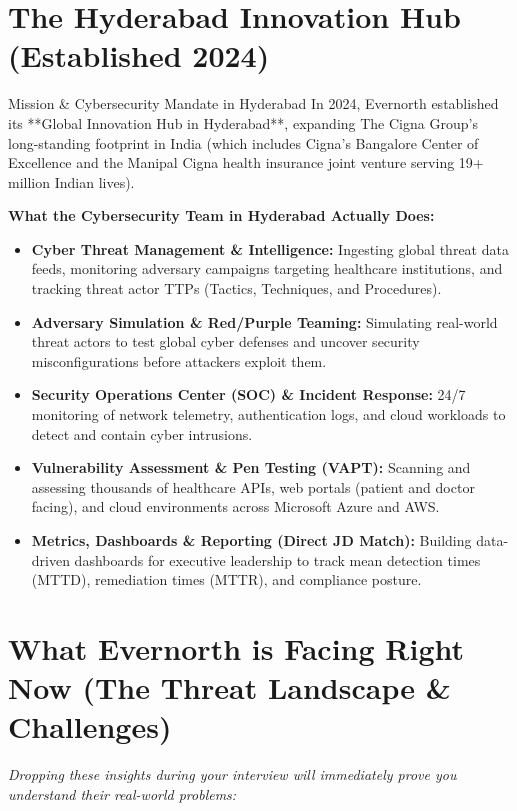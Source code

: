 \documentclass[11pt,a4paper]{article}
\begin{document}
\section{The Hyderabad Innovation Hub (Established 2024)}

\begin{evernorthbox}{Mission \& Cybersecurity Mandate in Hyderabad}
In 2024, Evernorth established its **Global Innovation Hub in Hyderabad**, expanding The Cigna Group's long-standing footprint in India (which includes Cigna's Bangalore Center of Excellence and the Manipal Cigna health insurance joint venture serving 19+ million Indian lives).

\textbf{What the Cybersecurity Team in Hyderabad Actually Does:}
\begin{itemize}
    \item \textbf{Cyber Threat Management \& Intelligence:} Ingesting global threat data feeds, monitoring adversary campaigns targeting healthcare institutions, and tracking threat actor TTPs (Tactics, Techniques, and Procedures).
    \item \textbf{Adversary Simulation \& Red/Purple Teaming:} Simulating real-world threat actors to test global cyber defenses and uncover security misconfigurations before attackers exploit them.
    \item \textbf{Security Operations Center (SOC) \& Incident Response:} 24/7 monitoring of network telemetry, authentication logs, and cloud workloads to detect and contain cyber intrusions.
    \item \textbf{Vulnerability Assessment \& Pen Testing (VAPT):} Scanning and assessing thousands of healthcare APIs, web portals (patient and doctor facing), and cloud environments across Microsoft Azure and AWS.
    \item \textbf{Metrics, Dashboards \& Reporting (Direct JD Match):} Building data-driven dashboards for executive leadership to track mean detection times (MTTD), remediation times (MTTR), and compliance posture.
\end{itemize}
\end{evernorthbox}

\section{What Evernorth is Facing Right Now (The Threat Landscape \& Challenges)}
\textit{Dropping these insights during your interview will immediately prove you understand their real-world problems:}
\end{document}
